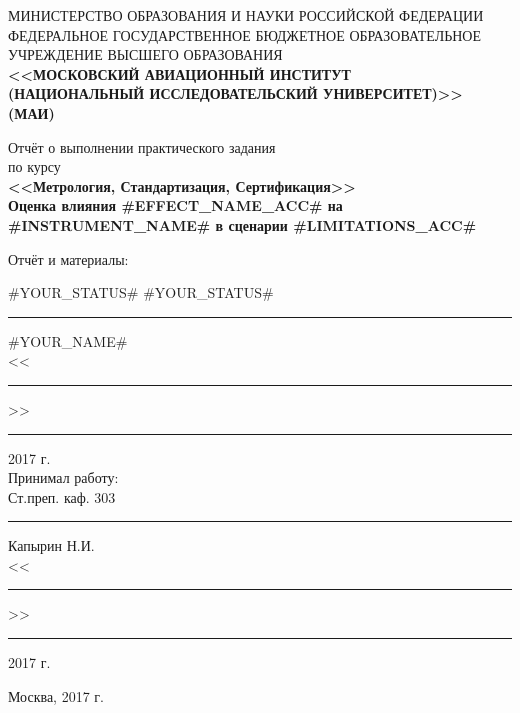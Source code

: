 \documentclass[12pt]{article}   %
\begin{document}
\thispagestyle{empty}
\begin{center}

{\scriptsize
МИНИСТЕРСТВО ОБРАЗОВАНИЯ И НАУКИ РОССИЙСКОЙ ФЕДЕРАЦИИ\\[.2cm]

ФЕДЕРАЛЬНОЕ ГОСУДАРСТВЕННОЕ БЮДЖЕТНОЕ ОБРАЗОВАТЕЛЬНОЕ\\[.2cm]

УЧРЕЖДЕНИЕ ВЫСШЕГО ОБРАЗОВАНИЯ\\[.2cm]

\textbf{<<МОСКОВСКИЙ АВИАЦИОННЫЙ ИНСТИТУТ}\\[.2cm]

\textbf{(НАЦИОНАЛЬНЫЙ ИССЛЕДОВАТЕЛЬСКИЙ УНИВЕРСИТЕТ)>> (МАИ)}\\[.2cm]
}

\vfill
{\large
Отчёт о выполнении практического задания\\
по курсу\\
\textbf{<<Метрология, Стандартизация, Сертификация>>}\\[0.4cm]
\bfseries Оценка влияния #EFFECT_NAME_ACC# на #INSTRUMENT_NAME# в сценарии #LIMITATIONS_ACC#\\[2cm]}

\vfill

\begin{minipage}[t]{0.3\textwidth}
	\begin{flushleft}
    Отчёт и материалы:\\\bigskip
    \end{flushleft}
\end{minipage}%
\begin{minipage}[t]{0.7\textwidth}
    \begin{flushright}
	#YOUR_STATUS# #YOUR_STATUS#\\[.4cm]
	\rule{4cm}{1pt} #YOUR_NAME#\\
	<<\rule{.8cm}{1pt}>> \rule{3cm}{1pt} 2017 г.\\\bigskip
	Принимал работу:\\
	Ст.преп. каф. 303\\[.4cm]
	\rule{4cm}{1pt} Капырин Н.И.\\
	<<\rule{.8cm}{1pt}>> \rule{3cm}{1pt} 2017 г.
    \end{flushright}
\end{minipage}

\vfill

{\large Москва, 2017 г.}
\end{center}
\end{document}
